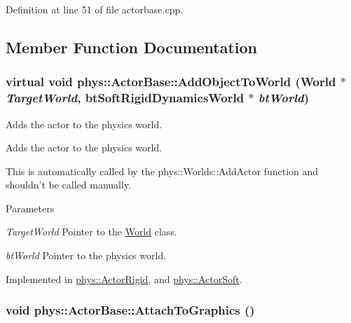 Definition at line 51 of file actorbase.cpp.



\subsection{Member Function Documentation}
\hypertarget{classphys_1_1ActorBase_ac5d4ad5a634b16000742f506ed5957fb}{
\subsubsection[{AddObjectToWorld}]{\setlength{\rightskip}{0pt plus 5cm}virtual void phys::ActorBase::AddObjectToWorld ({\bf World} $\ast$ {\em TargetWorld}, \/  btSoftRigidDynamicsWorld $\ast$ {\em btWorld})}}
\label{d8/d0f/classphys_1_1ActorBase_ac5d4ad5a634b16000742f506ed5957fb}


Adds the actor to the physics world. 

Adds the actor to the physics world. \par
 This is automatically called by the phys::Worlds::AddActor function and shouldn't be called manually. 
\begin{DoxyParams}{Parameters}
\item[{\em TargetWorld}]Pointer to the \hyperlink{classphys_1_1World}{World} class. \item[{\em btWorld}]Pointer to the physics world. \end{DoxyParams}


Implemented in \hyperlink{classphys_1_1ActorRigid_a3c56eb06fe6a7d468b7a67c45ade7be4}{phys::ActorRigid}, and \hyperlink{classphys_1_1ActorSoft_a3a704ab32f847a5d0e060f8a592efefd}{phys::ActorSoft}.

\hypertarget{classphys_1_1ActorBase_a45f190cb9b647bb3385d1298f9dab589}{
\subsubsection[{AttachToGraphics}]{\setlength{\rightskip}{0pt plus 5cm}void phys::ActorBase::AttachToGraphics ()}}
\label{d8/d0f/classphys_1_1ActorBase_a45f190cb9b647bb3385d1298f9dab589}


